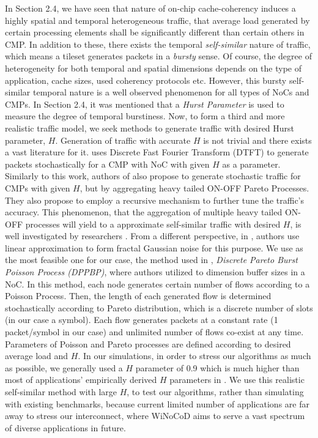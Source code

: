 In Section 2.4, we have seen that nature of on-chip cache-coherency induces a highly spatial and temporal heterogeneous traffic, that average load generated by certain processing elements shall be significantly different than certain others in CMP. In addition to these, there exists the temporal \textit{self-similar} nature of traffic, which means a tileset generates packets in a \textit{bursty} sense. Of course, the degree of heterogeneity for both temporal and spatial dimensions depends on the type of application, cache sizes, used coherency protocols etc. However, this bursty self-similar temporal nature is a well observed phenomenon for all types of NoCs and CMPs. In Section 2.4, it was mentioned that a \textit{Hurst Parameter} is used to measure the degree of temporal burstiness. Now, to form a third and more realistic traffic model, we seek methods to generate traffic with desired Hurst parameter, $H$. Generation of traffic with accurate $H$ is not trivial and there exists a vast literature for it. \cite{soteriou2006statistical} uses Discrete Fast Fourier Transform (DTFT) to generate packets stochastically for a CMP with NoC with given $H$ as a parameter. Similarly to this work, authors of \cite{bahn2008generic} also propose to generate stochastic traffic for CMPs with given $H$, but by aggregating heavy tailed ON-OFF Pareto Processes. They also propose to employ a recursive mechanism to further tune the traffic's accuracy. This phenomenon, that the aggregation of multiple heavy tailed ON-OFF processes will yield to a approximate self-similar traffic with desired $H$, is well investigated by researchers \cite{pruthi1995heavy}\cite{kramer2000generating}\cite{addie1999modeling}. From a different perspective, in \cite{ledesma2000synthesis}, authors use linear approximation to form fractal Gaussian noise for this purpose. We use as the most feasible one for our case, the method used in \cite{khonsari2008mathematical}, \textit{Discrete Pareto Burst Poisson Process (DPPBP)}, where authors utilized to dimension buffer sizes in a NoC. In this method, each node generates certain number of flows according to a Poisson Process. Then, the length of each generated flow is determined stochastically according to Pareto distribution, which is a discrete number of slots (in our case a symbol). Each flow generates packets at a constant rate (1 packet/symbol in our case) and unlimited number of flows co-exist at any time. Parameters of Poisson and Pareto processes are defined according to desired average load and $H$. In our simulations, in order to stress our algorithms as much as possible, we generally used a $H$ parameter of 0.9 which is much higher than most of applications' empirically derived $H$ parameters in \cite{soteriou2006statistical}. We use this realistic self-similar method with large $H$, to test our algorithms, rather than simulating with existing benchmarks, because current limited number of applications are far away to stress our interconnect, where WiNoCoD aims to serve a vast spectrum of diverse applications in future.  

